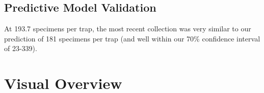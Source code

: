 \documentclass{article}
\begin{document}
\vspace{2mm}
\subsection*{Predictive Model Validation}


\begin{changemargin}{1.5cm}{1.5cm} 

At 193.7 specimens per trap, the most recent collection was very similar to our prediction of 181 specimens per trap (and well within our 70\% confidence interval of 23-339).

\end{changemargin}

\hrulefill


\fancyhfoffset[E,O]{0pt}


\section*{Visual Overview}
\hrulefill
\end{document}
